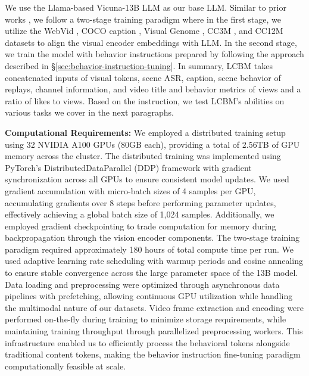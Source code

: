 We use the Llama-based Vicuna-13B LLM \citep{touvron2023llama,vicuna2023} as our base LLM. Similar to prior works \citep{liu2023visual,ge2023planting,li2023blip2,zhu2023minigpt}, we follow a two-stage training paradigm where in the first stage, we utilize the WebVid \citep{bain2021frozen}, COCO caption \citep{chen2015microsoft}, Visual Genome \citep{krishna2017dense}, CC3M \citep{sharma2018conceptual}, and CC12M \citep{changpinyo2021conceptual} datasets to align the visual encoder embeddings with LLM. In the second stage, we train the model with behavior instructions prepared by following the approach described in \S\ref{sec:behavior-instruction-tuning}. In summary, LCBM takes concatenated inputs of visual tokens, scene ASR, caption, scene behavior of replays, channel information, and video title and behavior metrics of views and a ratio of likes to views. Based on the instruction, we test LCBM's abilities on various tasks we cover in the next paragraphs.

\textbf{Computational Requirements:} We employed a distributed training setup using 32 NVIDIA A100 GPUs (80GB each), providing a total of 2.56TB of GPU memory across the cluster. The distributed training was implemented using PyTorch's DistributedDataParallel (DDP) framework with gradient synchronization across all GPUs to ensure consistent model updates. We used gradient accumulation with micro-batch sizes of 4 samples per GPU, accumulating gradients over 8 steps before performing parameter updates, effectively achieving a global batch size of 1,024 samples. Additionally, we employed gradient checkpointing to trade computation for memory during backpropagation through the vision encoder components. The two-stage training paradigm required approximately 180 hours of total compute time per run. We used adaptive learning rate scheduling with warmup periods and cosine annealing to ensure stable convergence across the large parameter space of the 13B model. Data loading and preprocessing were optimized through asynchronous data pipelines with prefetching, allowing continuous GPU utilization while handling the multimodal nature of our datasets. Video frame extraction and encoding were performed on-the-fly during training to minimize storage requirements, while maintaining training throughput through parallelized preprocessing workers. This infrastructure enabled us to efficiently process the behavioral tokens alongside traditional content tokens, making the behavior instruction fine-tuning paradigm computationally feasible at scale.


